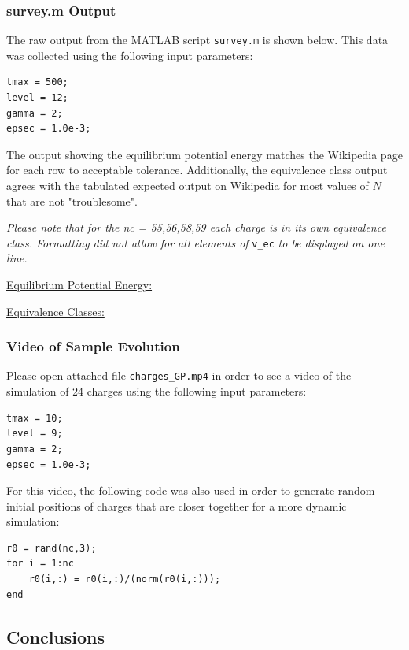\documentclass[10pt]{article}
\def\code#1{\texttt{#1}} %
\begin{document}
\subsubsection*{survey.m Output}

The raw output from the MATLAB script \code{survey.m} is shown below. This data was collected using
the following input parameters:
\begin{verbatim}
tmax = 500;
level = 12;
gamma = 2;
epsec = 1.0e-3;
\end{verbatim}
The output showing the equilibrium potential energy matches the Wikipedia page for each row to 
acceptable tolerance. Additionally, the equivalence class output agrees with the tabulated 
expected output on Wikipedia for most values of $N$ that are not "troublesome". 

\textit{Please note that for the nc = 55,56,58,59 each charge is in its own equivalence class. 
Formatting did not allow for all elements of} \code{v\_ec} \textit{to be displayed on one line.}

\underline{Equilibrium Potential Energy:}


\underline{Equivalence Classes:}


\subsubsection*{Video of Sample Evolution}

Please open attached file \code{charges\_GP.mp4} in order to see a video of the simulation of 24 charges 
using the following input parameters:
\begin{verbatim}
tmax = 10;
level = 9;
gamma = 2;
epsec = 1.0e-3;
\end{verbatim}
For this video, the following code was also used in order to generate random initial positions of charges
that are closer together for a more dynamic simulation:
\begin{verbatim}
r0 = rand(nc,3);
for i = 1:nc
    r0(i,:) = r0(i,:)/(norm(r0(i,:)));
end
\end{verbatim}

\subsection*{Conclusions}
\end{document}
